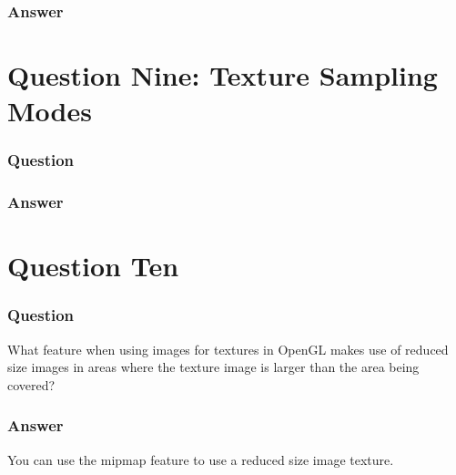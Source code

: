\documentclass{report}
\begin{document}
\section{Answer}
\part{Question Nine: Texture Sampling Modes}
\section{Question}
\section{Answer}
\part{Question Ten}
\section{Question}
What feature when using images for textures in OpenGL makes use of reduced size images in areas where the texture image is larger than the area being covered?
\section{Answer}
You can use the mipmap feature to use a reduced size image texture.
\end{document}
